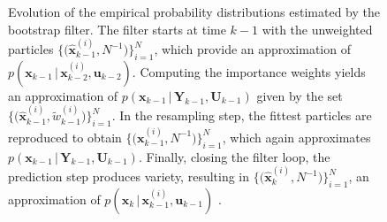 \begin{figure}[t]
\begin{tikzpicture}[scale=1.0, auto, thick, node distance=3cm,>=latex']
\end{tikzpicture}
\caption[Evolution of the empirical probability distributions estimated by the bootstrap filter.]{Evolution of the empirical probability distributions estimated by the bootstrap filter. The filter starts at time $k-1$ with the unweighted particles $\big\{\big(\hat{\bm{x}}^{(i)}_{k-1}, N^{-1}\big)\big\}_{i=1}^N$, which provide an approximation of $p(\bm{x}_{k-1}\,|\,\bm{x}^{(i)}_{k-2}, \bm{u}_{k-2})$. Computing the importance weights yields an approximation of $p(\bm{x}_{k-1}\,|\,\bm{Y}_{k-1}, \bm{U}_{k-1})$ given by the set $\big\{\big(\hat{\bm{x}}^{(i)}_{k-1}, \tilde{w}^{(i)}_{k-1}\big)\big\}_{i=1}^N$. In the resampling step, the fittest particles are reproduced to obtain $\big\{\big(\bm{x}^{(i)}_{k-1}, N^{-1}\big)\big\}_{i=1}^N$, which again approximates $p(\bm{x}_{k-1}\,|\,\bm{Y}_{k-1}, \bm{U}_{k-1})$. Finally, closing the filter loop, the prediction step produces variety, resulting in $\big\{\big(\hat{\bm{x}}^{(i)}_{k}, N^{-1}\big)\big\}_{i=1}^N$, an approximation of $p(\bm{x}_{k}\,|\,\bm{x}^{(i)}_{k-1}, \bm{u}_{k-1})$ \cite{merwe2000scented}.}
	\label{fig:bootstrap}
\end{figure}

